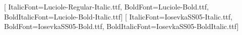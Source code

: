 
\usepackage{fancyhdr}
\pagestyle{fancy}\fancyhf{}
\renewcommand{\headrulewidth}{0pt}
\setcounter{secnumdepth}{3}
\setlength{\columnsep}{0.8cm}
\setlength{\parskip}{0.5em}
\setlength{\parindent}{0pt}
\raggedbottom

%
%
\usepackage{fontspec}
\usepackage{unicode-math}
\usepackage[protrusion=true,expansion=false,final]{microtype}

\setmainfont{Luciole-Regular.ttf}[
  ItalicFont=Luciole-Regular-Italic.ttf,
  BoldFont=Luciole-Bold.ttf,
  BoldItalicFont=Luciole-Bold-Italic.ttf]
\setmonofont{IosevkaSS05-Regular.ttf}[
  ItalicFont=IosevkaSS05-Italic.ttf,
  BoldFont=IosevkaSS05-Bold.ttf,
  BoldItalicFont=IosevkaSS05-BoldItalic.ttf]

